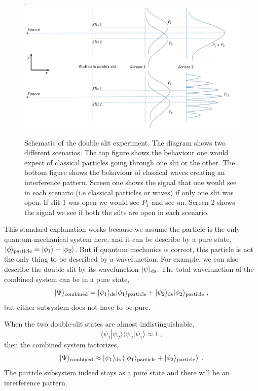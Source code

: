 \documentclass[aps,showpacs,twocolumn,floats,prd,superscriptaddress,nofootinbib]{revtex4-1}
\begin{document}
\begin{figure}[h!]
\begin{center}.
\includegraphics[scale = 0.5]{DSe.pdf}
\caption{Schematic of the double slit experiment. The diagram shows two different scenarios. The top figure shows the behaviour one would expect of classical particles going through one slit or the other. The bottom figure shows the behaviour of classical waves creating an interference pattern. Screen one shows the signal that one would see in each scenario (i.e classical particles or waves) if only one slit was open. If slit 1 was open we would see $P_1$ and see on. Screen 2 shows the signal we see if both the silts are open in each scenario.}
\label{fig-doubleslit}
\end{center}
\end{figure}

This standard explanation works because we assume the particle is the only quantum-mechanical system here, and it can be describe by a pure state, $|\phi\rangle_{\rm particle} = |\phi_1\rangle + |\phi_2\rangle$.
But if quantum mechanics is correct, this particle is not the only thing to be described by a wavefunction. 
For example, we can also describe the double-slit by its wavefunction $|\psi\rangle_{\rm ds}$. The total wavefunction of the combined system can be in a pure state,
\begin{equation}
|\Psi\rangle_{\rm combined} = |\psi_1\rangle_{\rm ds}|\phi_1\rangle_{\rm particle} 
+ |\psi_2\rangle_{\rm ds}|\phi_2\rangle_{\rm particle} ~,
\end{equation}
but either subsystem does not have to be pure.

When the two double-slit states are almost indistinguishable,
\begin{equation}
\langle\psi_1|\psi_2\rangle\langle\psi_2|\psi_1\rangle \approx 1~,
\label{eq-pure}
\end{equation}
then the combined system factorizes,
\begin{equation}
|\Psi\rangle_{\rm combined} \approx |\psi_1\rangle_{\rm ds}
\left(|\phi_1\rangle_{\rm particle} + |\phi_2\rangle_{\rm particle}\right) ~.
\end{equation}
The particle subsystem indeed stays as a pure state and there will be an interference pattern.
\end{document}
